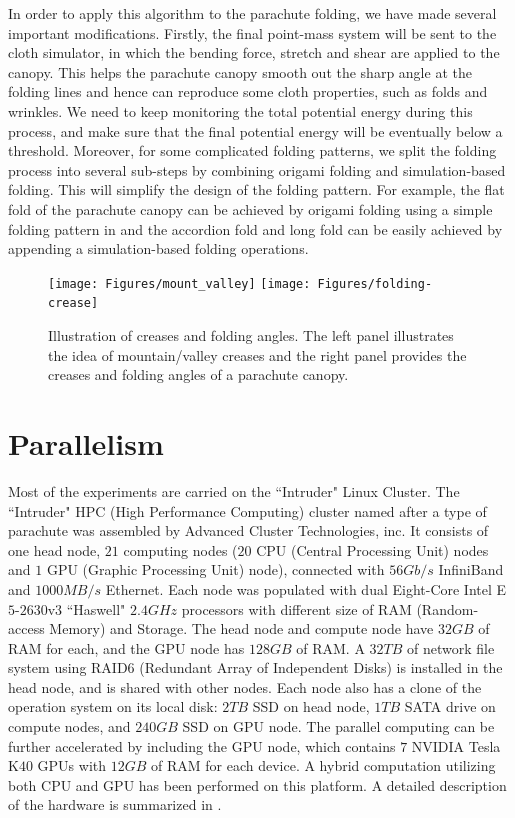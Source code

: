 In order to apply this algorithm to the parachute folding, we have made several important modifications. Firstly, the final point-mass system will be sent to the cloth simulator, in which the bending force, stretch and shear are applied to the canopy. This helps the parachute canopy smooth out the sharp angle at the folding lines and hence can reproduce some cloth properties, such as folds and wrinkles. We need to keep monitoring the total potential energy during this process, and make sure that the final potential energy will be eventually below a threshold. Moreover, for some complicated folding patterns, we split the folding process into several sub-steps by combining origami folding and simulation-based folding. This will simplify the design of the folding pattern. For example, the flat fold of the parachute canopy can be achieved by origami folding using a simple folding pattern in  and the accordion fold and long fold can be easily achieved by appending a simulation-based folding operations.
  
\begin{figure}\centering
\texttt{[image: Figures/mount\_valley]}
\texttt{[image: Figures/folding-crease]}
\caption{Illustration of creases and folding angles. The left panel illustrates the idea of mountain/valley creases and the right panel provides the creases and folding angles of a parachute canopy.\label{fig:folding_crease}}
\end{figure}

\section{Parallelism}
Most of the experiments are carried on the ``Intruder" Linux Cluster.
The ``Intruder" HPC (High Performance Computing) cluster named after a type of
parachute was assembled by Advanced Cluster Technologies, inc. It consists of
one head node, $21$ computing nodes ($20$ CPU (Central Processing Unit) nodes
and $1$ GPU (Graphic Processing Unit) node), connected with $56Gb/s$ InfiniBand
and $1000MB/s$ Ethernet. Each node was populated with dual Eight-Core Intel
E$5$-$2630$v$3$ ``Haswell" $2.4GHz$ processors with different size of RAM
(Random-access Memory) and Storage. The head node and compute node have $32GB$
of RAM for each, and the GPU node has $128GB$ of RAM. A $32TB$ of network file
system using RAID6 (Redundant Array of Independent Disks) is installed in the
head node, and is shared with other nodes. Each node also has a clone of the
operation system on its local disk: $2TB$ SSD on head node, $1TB$ SATA drive on
compute nodes, and $240GB$ SSD on GPU node. The parallel computing can be
further accelerated by including the GPU node, which contains $7$ NVIDIA
Tesla K$40$ GPUs with $12GB$ of RAM for each device. A hybrid computation
utilizing both CPU and GPU has been performed on this platform. A detailed
description of the hardware is summarized in .

